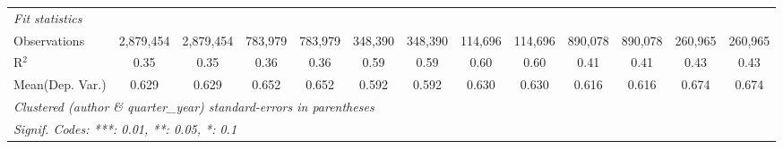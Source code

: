 \begin{tabular}{lcccccccccccc}
   \midrule
   \emph{Fit statistics}\\
   Observations                             & 2,879,454     & 2,879,454    & 783,979       & 783,979      & 348,390 & 348,390     & 114,696       & 114,696     & 890,078       & 890,078  & 260,965       & 260,965\\  
   R$^2$                                    & 0.35          & 0.35         & 0.36          & 0.36         & 0.59    & 0.59        & 0.60          & 0.60        & 0.41          & 0.41     & 0.43          & 0.43\\  
Mean(Dep. Var.) & 0.629 & 0.629 & 0.652 & 0.652 & 0.592 & 0.592 & 0.630 & 0.630 & 0.616 & 0.616 & 0.674 & 0.674 \\
   \midrule \midrule
   \multicolumn{13}{l}{\emph{Clustered (author \& quarter\_year) standard-errors in parentheses}}\\
   \multicolumn{13}{l}{\emph{Signif. Codes: ***: 0.01, **: 0.05, *: 0.1}}\\
\end{tabular}
\par\endgroup
